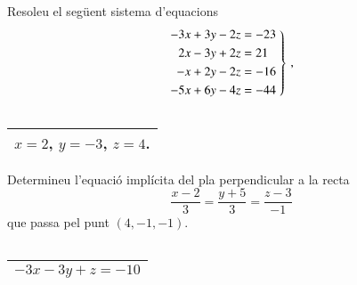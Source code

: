 \documentclass[11pt,catalan]{article}
\begin{document}
\begin{enunciat}
Resoleu el següent sistema d'equacions
\[
  \left.\aligned - 3 x + 3 y - 2 z &= -23 \\ 2 x - 3 y + 2 z &= 21 \\ - x + 2 y - 2 z &= -16 \\ - 5 x + 6 y - 4 z &= -44 \endaligned\;\right\}\,,
\]
\end{enunciat}

\begin{quadricula}
\begin{tabular}{|C{5cm}{0.5cm}|}
\hline
  \\
\hline
\end{tabular}
\end{quadricula}

\begin{solucio}
\begin{center}
\begin{tabular}{|C{5cm}{0.5cm}|}
\hline
$x=2$, $y=-3$, $z=4$. \\
\hline
\end{tabular}
\end{center}
\end{solucio}


\begin{enunciat}
Determineu l'equació implícita del pla perpendicular a la recta 
\[
  \frac{x - 2}{3} = \frac{y + 5}{3} = \frac{z - 3}{-1}
\]
que passa pel punt $(4,-1,-1)$.
\end{enunciat}

\begin{quadricula}
\begin{tabular}{|C{5cm}{0.5cm}|}
\hline
  \\
\hline
\end{tabular}
\end{quadricula}

\begin{solucio}
\begin{center}
\begin{tabular}{|C{5cm}{0.5cm}|}
\hline
$- 3 x - 3 y + z = -10$ \\
\hline
\end{tabular}
\end{center}
\end{solucio}
\end{document}
